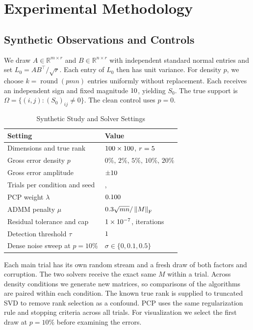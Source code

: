 \documentclass[conference]{IEEEtran}
\newcommand{\fro}[1]{\left\|#1\right\|_{\mathrm F}}
\begin{document}
\section{Experimental Methodology}
\subsection{Synthetic Observations and Controls}
We draw $A\in\mathbb R^{m\times r}$ and $B\in\mathbb R^{n\times r}$ with independent standard normal entries and set $L_0=AB^\top/\sqrt{r}$. Each entry of $L_0$ then has unit variance. For density $p$, we choose $k=\operatorname{round}(pmn)$ entries uniformly without replacement. Each receives an independent sign and fixed magnitude $10$, yielding $S_0$. The true support is $\Omega=\{(i,j):(S_0)_{ij}\ne0\}$. The clean control uses $p=0$.

\begin{table}[!t]
\caption{Synthetic Study and Solver Settings}
\label{tab:settings}
\centering
\small
\begin{tabular}{@{}ll@{}}
\toprule
Setting & Value \\
\midrule
Dimensions and true rank & $100\times100$, $r=5$ \\
Gross error density $p$ & $0\%,\,2\%,\,5\%,\,10\%,\,20\%$ \\
Gross error amplitude & $\pm10$ \\
Trials per condition and seed & \Trials{}, \Seed{} \\
PCP weight $\lambda$ & $0.100$ \\
ADMM penalty $\mu$ & $\PenaltyScale\sqrt{mn}/\fro{M}$ \\
Residual tolerance and cap & $1\times10^{-7}$, \IterationCap{} iterations \\
Detection threshold $\tau$ & $1$ \\
Dense noise sweep at $p=10\%$ & $\sigma\in\{0,0.1,0.5\}$ \\
\bottomrule
\end{tabular}
\end{table}

Each main trial has its own random stream and a fresh draw of both factors and corruption. The two solvers receive the exact same $M$ within a trial. Across density conditions we generate new matrices, so comparisons of the algorithms are paired within each condition. The known true rank is supplied to truncated SVD to remove rank selection as a confound. PCP uses the same regularization rule and stopping criteria across all trials. For visualization we select the first draw at $p=10\%$ before examining the errors.
\end{document}
